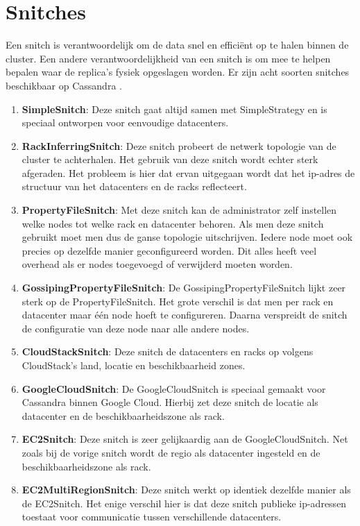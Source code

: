 \section{Snitches}
Een snitch is verantwoordelijk om de data snel en efficiënt op te halen binnen de cluster.
Een andere verantwoordelijkheid van een snitch is om mee te helpen bepalen waar de replica's fysiek opgeslagen worden.
Er zijn acht soorten snitches beschikbaar op Cassandra \citep{strickland2014availability}.

\begin{enumerate}
	\item \textbf{SimpleSnitch}:
	Deze snitch gaat altijd samen met SimpleStrategy en is speciaal ontworpen voor eenvoudige datacenters.
	
	\item \textbf{RackInferringSnitch}:
	Deze snitch probeert de netwerk topologie van de cluster te achterhalen.
	Het gebruik van deze snitch wordt echter sterk afgeraden.
	Het probleem is hier dat ervan uitgegaan wordt dat het ip-adres de structuur van het datacenters en de racks reflecteert.
	
	\item \textbf{PropertyFileSnitch}:
	Met deze snitch kan de administrator zelf instellen welke nodes tot welke rack en datacenter behoren.
	Als men deze snitch gebruikt moet men dus de ganse topologie uitschrijven. 
	Iedere node moet ook precies op dezelfde manier geconfigureerd worden.
	Dit alles heeft veel overhead als er nodes toegevoegd of verwijderd moeten worden.
	
	\item \textbf{GossipingPropertyFileSnitch}:
	De GossipingPropertyFileSnitch lijkt zeer sterk op de PropertyFileSnitch.
	Het grote verschil is dat men per rack en datacenter maar één node hoeft te configureren.
	Daarna verspreidt de snitch de configuratie van deze node naar alle andere nodes.
	
	\item \textbf{CloudStackSnitch}:
	Deze snitch de datacenters en racks op volgens CloudStack's land, locatie en beschikbaarheid zones.
	
	\item \textbf{GoogleCloudSnitch}:
	De GoogleCloudSnitch is speciaal gemaakt voor Cassandra binnen Google Cloud.
	Hierbij zet deze snitch de locatie als datacenter en de beschikbaarheidszone als rack.
	
	\item \textbf{EC2Snitch}:
	Deze snitch is zeer gelijkaardig aan de GoogleCloudSnitch.
	Net zoals bij de vorige snitch wordt de regio als datacenter ingesteld en de beschikbaarheidszone als rack.
	
	\item \textbf{EC2MultiRegionSnitch}:
	Deze snitch werkt op identiek dezelfde manier als de EC2Snitch.
	Het enige verschil hier is dat deze snitch publieke ip-adressen toestaat voor communicatie tussen verschillende datacenters.
	
\end{enumerate}

